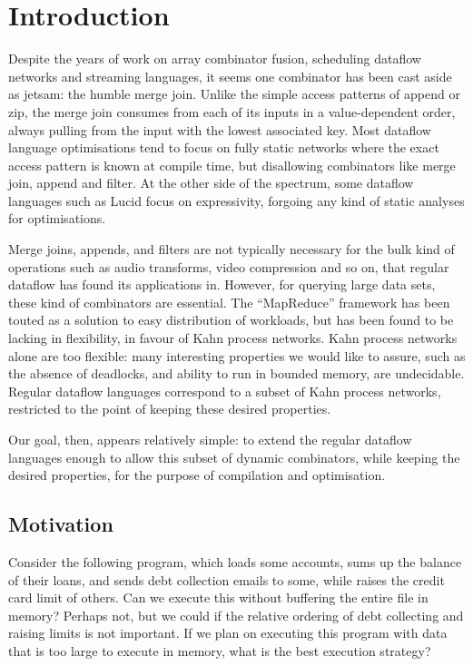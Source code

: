 \section{Introduction}
\label{s:Introduction}

Despite the years of work on array combinator fusion, scheduling dataflow networks and streaming languages, it seems one combinator has been cast aside as jetsam: the humble merge join.
Unlike the simple access patterns of append or zip, the merge join consumes from each of its inputs in a value-dependent order, always pulling from the input with the lowest associated key.
Most dataflow language optimisations tend to focus on fully static networks where the exact access pattern is known at compile time\cite{thies2002streamit}, but disallowing combinators like merge join, append and filter.
At the other side of the spectrum, some dataflow languages such as Lucid\cite{stephens1997survey} focus on expressivity, forgoing any kind of static analyses for optimisations.

Merge joins, appends, and filters are not typically necessary for the bulk kind of operations such as audio transforms, video compression and so on, that regular dataflow has found its applications in\cite{johnston2004advances}.
However, for querying large data sets, these kind of combinators are essential.
The ``MapReduce'' framework has been touted as a solution to easy distribution of workloads, but has been found to be lacking in flexibility\cite{vrba2009kahn}, in favour of Kahn process networks.
Kahn process networks alone are too flexible: many interesting properties we would like to assure, such as the absence of deadlocks, and ability to run in bounded memory, are undecidable.
Regular dataflow languages correspond to a subset of Kahn process networks, restricted to the point of keeping these desired properties\cite{thies2009language}.

Our goal, then, appears relatively simple: to extend the regular dataflow languages enough to allow this subset of dynamic combinators, while keeping the desired properties, for the purpose of compilation and optimisation.

\subsection{Motivation}

Consider the following program, which loads some accounts, sums up the balance of their loans, and sends debt collection emails to some, while raises the credit card limit of others.
Can we execute this without buffering the entire file in memory? Perhaps not, but we could if the relative ordering of debt collecting and raising limits is not important.
If we plan on executing this program with data that is too large to execute in memory, what is the best execution strategy?

